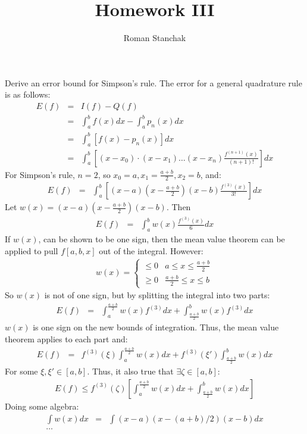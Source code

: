 \documentclass{article}
\author{Roman Stanchak}
\title{Homework III}
\newcommand{\ea}[1]{\begin{eqnarray*}#1\end{eqnarray*}}
\newcommand{\leftbrace}[1]{\left\{\begin{array}{ll}#1 \end{array}\right.}
\begin{document}

\maketitle
{} Derive an error bound for Simpson's rule.
 The error for a general quadrature rule is as follows:
\ea{
	E(f) &=&  I(f) - Q(f) \\
	&=&  \int_a^b f(x)dx - \int_a^b p_n(x) dx \\
	&=& \int_a^b \left[ f(x) - p_n(x) \right] dx \\
	&=& \int_a^b \left[ (x-x_0)\cdot(x-x_1)\dots(x-x_n) \frac{f^{(n+1)}(x)}{(n+1)!} \right] dx
}
For Simpson's rule, $n=2$, so $x_0=a,x_1=\frac{a+b}{2},x_2=b$, and:
\ea{
E(f) &=& \int_a^b \left[ (x-a)\left(x-\frac{a+b}{2}\right)(x-b) \frac{f^{(3)}(x)}{3!}\right] dx
}
Let $w(x) = (x-a)\left(x-\frac{a+b}{2}\right)(x-b)$.
Then
\ea{
	E(f) &=& \int_a^b w(x) \frac{ f^{(3)}(x) }{ 6 } dx
}
If $w(x)$, can be shown to be one sign, then the mean value theorem can be applied to pull $f[a,b,x]$ out of the integral.  However:
\ea{
	w(x) = \leftbrace{ \le 0 & a\le x \le \frac{a+b}{2} \\
	                   \ge 0 & \frac{a+b}{2} \le x \le b 
					  }
}
So $w(x)$ is not of one sign, but by splitting the integral into two parts:
\ea{
E(f) &=& \int_a^{ \frac{a+b}{2} } w(x) f^{(3)} dx + 
\int_{ \frac{a+b}{2} }^b w(x) f^{(3)} dx
}
$w(x)$ is one sign on the new bounds of integration.  Thus, the mean value theorem applies to each part and:
\ea{
	E(f) &=& f^{(3)}(\xi) \int_a^{ \frac{a+b}{2} } w(x) dx +
	f^{(3)}(\xi') \int_{ \frac{a+b}{2} }^b w(x) dx
}
For some $\xi,\xi' \in [a,b]$.  Thus, it also true that $\exists \zeta \in [a,b]$:
\ea{
	E(f) \le f^{(3)}(\zeta) \left[  \int_a^{ \frac{a+b}{2} } w(x) dx + 
		\int_{ \frac{a+b}{2} }^b w(x) dx \right]
}
Doing some algebra:
\ea{
	\int w(x) dx &=&  \int (x-a)(x-(a+b)/2)(x-b)dx\\
	\dots
}
\end{document}
